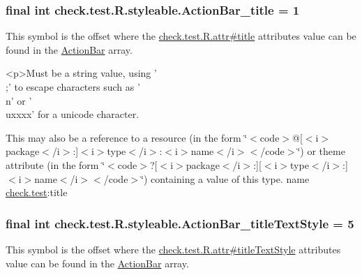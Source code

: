 \subsubsection[{Action\+Bar\+\_\+title}]{\setlength{\rightskip}{0pt plus 5cm}final int check.\+test.\+R.\+styleable.\+Action\+Bar\+\_\+title = 1\hspace{0.3cm}{\ttfamily [static]}}\label{classcheck_1_1test_1_1_r_1_1styleable_a9f68b2ef978d31096a2c231b92d807bc}
This symbol is the offset where the \hyperlink{classcheck_1_1test_1_1_r_1_1attr_a002c5907c5484ce9f870aa21ac099f9b}{check.\+test.\+R.\+attr\#title} attribute\textquotesingle{}s value can be found in the \hyperlink{classcheck_1_1test_1_1_r_1_1styleable_ad0a4d403cb244ea4d22c6f6ebf2c2cdf}{Action\+Bar} array.

\begin{DoxyVerb}      <p>Must be a string value, using '\\;' to escape characters such as '\\n' or '\\uxxxx' for a unicode character.
\end{DoxyVerb}
 

This may also be a reference to a resource (in the form \char`\"{}$<$code$>$@\mbox{[}$<$i$>$package$<$/i$>$\+:\mbox{]}$<$i$>$type$<$/i$>$\+:$<$i$>$name$<$/i$>$$<$/code$>$\char`\"{}) or theme attribute (in the form \char`\"{}$<$code$>$?\mbox{[}$<$i$>$package$<$/i$>$\+:\mbox{]}\mbox{[}$<$i$>$type$<$/i$>$\+:\mbox{]}$<$i$>$name$<$/i$>$$<$/code$>$\char`\"{}) containing a value of this type.  name \hyperlink{namespacecheck_1_1test}{check.\+test}\+:title \hypertarget{classcheck_1_1test_1_1_r_1_1styleable_a35a91b9015c202578382afcbaba1eab6}{}
\subsubsection[{Action\+Bar\+\_\+title\+Text\+Style}]{\setlength{\rightskip}{0pt plus 5cm}final int check.\+test.\+R.\+styleable.\+Action\+Bar\+\_\+title\+Text\+Style = 5\hspace{0.3cm}{\ttfamily [static]}}\label{classcheck_1_1test_1_1_r_1_1styleable_a35a91b9015c202578382afcbaba1eab6}
This symbol is the offset where the \hyperlink{classcheck_1_1test_1_1_r_1_1attr_a3132c1db5fe53bffcbde427849ea7bc8}{check.\+test.\+R.\+attr\#title\+Text\+Style} attribute\textquotesingle{}s value can be found in the \hyperlink{classcheck_1_1test_1_1_r_1_1styleable_ad0a4d403cb244ea4d22c6f6ebf2c2cdf}{Action\+Bar} array.


